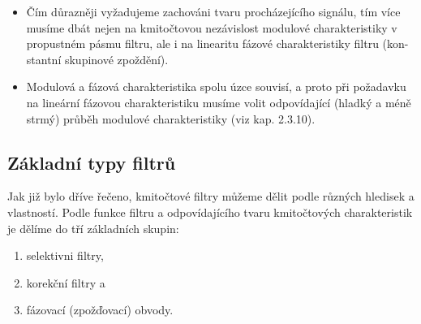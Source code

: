         \begin{mdframed}[style=mdnote]
          \begin{note}
            \begin{itemize}[noitemsep]
              \item Čím důrazněji vyžadujeme zachováni tvaru procházejícího signálu, tím více musíme
                    dbát nejen na kmitočtovou nezávislost modulové charakteristiky v propustném
                    pásmu filtru, ale i na linearitu fázové charakteristiky filtru (kon- stantní
                    skupinové zpoždění). 
              \item Modulová a fázová charakteristika spolu úzce souvisí, a proto při požadavku na
                    lineární fázovou charakteristiku musíme volit odpovídající (hladký a méně strmý)
                    průběh modulové charakteristiky (viz kap. 2.3.10). 
            \end{itemize}
          \end{note}
        \end{mdframed}

    \subsection{Základní typy filtrů}
        Jak již bylo dříve řečeno, kmitočtové filtry můžeme dělit podle různých hledisek a
        vlastností. Podle funkce filtru a odpovídajícího tvaru kmitočtových charakteristik je
        dělíme do tří základních skupin:
        \begin{enumerate}[leftmargin=2cm,rightmargin=1cm, label=\emph{\alph*}),noitemsep]
          \item selektivni filtry, 
          \item korekční filtry a 
          \item fázovací (zpožďovací) obvody.
        \end{enumerate}
         
